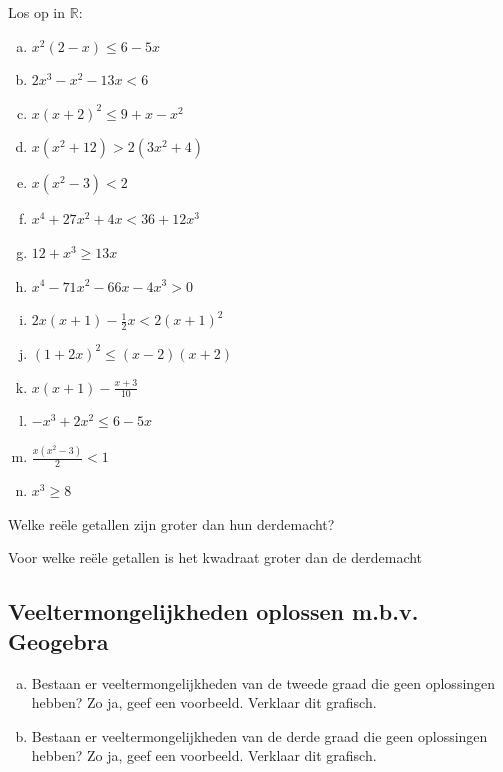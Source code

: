 \documentclass[12pt]{article}
\begin{document}
\begin{oefening}
  Los op in $\mathbb{R}$:
  \begin{multicols}{2}
    \begin{enumerate}[(a)]
      \itemsep0.6em
    \item $x^2(2-x)\leq6-5x$
    \item $2x^3-x^2-13x<6$
    \item $x(x+2)^2\leq9+x-x^2$
    \item $x(x^2+12)>2(3x^2+4)$
    \item $x(x^2-3)<2$
    \item $x^4+27x^2+4x<36+12x^3$
    \item $12+x^3\geq13x$
    \item $x^4-71x^2-66x-4x^3>0$
    \item $2x(x+1)-\frac{1}{2}x<2(x+1)^2$
    \item $(1+2x)^2\leq(x-2)(x+2)$
    \item $x(x+1)-\frac{x+3}{10}$
    \item $-x^3+2x^2\leq6-5x$
    \item $\frac{x(x^2-3)}{2}<1$
    \item $x^3\geq8$
    \end{enumerate}
  \end{multicols}
\end{oefening}

\begin{oefening}
  Welke reële getallen zijn groter dan hun derdemacht?
\end{oefening}

\begin{oefening}
  Voor welke reële getallen is het kwadraat groter dan de derdemacht
\end{oefening}

\begin{theorie}
\subsection{Veeltermongelijkheden oplossen m.b.v. Geogebra}
\end{theorie}

\begin{oefening}
  \begin{enumerate}[(a)]
  \item Bestaan er veeltermongelijkheden van de tweede graad die geen
    oplossingen hebben? Zo ja, geef een voorbeeld. Verklaar dit
    grafisch.
  \item Bestaan er veeltermongelijkheden van de derde graad die geen
    oplossingen hebben? Zo ja, geef een voorbeeld. Verklaar dit
    grafisch.
  \end{enumerate}
\end{oefening}
\end{document}
